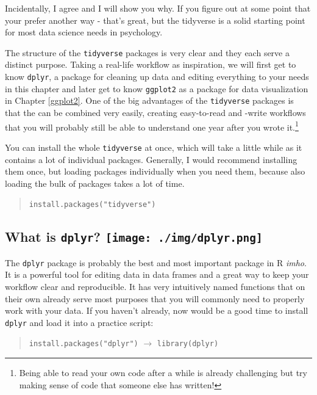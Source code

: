 \documentclass[
]{book}
\begin{document}
Incidentally, I agree and I will show you why.
If you figure out at some point that your prefer another way - that's great, but the tidyverse is a solid starting point for most data science needs in psychology.

The structure of the \texttt{tidyverse} packages is very clear and they each serve a distinct purpose.
Taking a real-life workflow as inspiration, we will first get to know \texttt{dplyr}, a package for cleaning up data and editing everything to your needs in this chapter and later get to know \texttt{ggplot2} as a package for data visualization in Chapter \ref{ggplot2}.
One of the big advantages of the \texttt{tidyverse} packages is that the can be combined very easily, creating easy-to-read and -write workflows that you will probably still be able to understand one year after you wrote it.\footnote{Being able to read your own code after a while is already challenging but try making sense of code that someone else has written!}

You can install the whole \texttt{tidyverse} at once, which will take a little while as it contains a lot of individual packages.
Generally, I would recommend installing them once, but loading packages individually when you need them, because also loading the bulk of packages takes a lot of time.

\begin{quote}
\texttt{install.packages("tidyverse")}
\end{quote}

\subsection[What is \texttt{dplyr}? ]{\texorpdfstring{What is \texttt{dplyr}? \protect\texttt{[image: ./img/dplyr.png]}}{What is dplyr? dplyr logo}}\label{what-is-dplyr-dplyr-logo}

The \texttt{dplyr} package is probably the best and most important package in R \emph{imho}.
It is a powerful tool for editing data in data frames and a great way to keep your workflow clear and reproducible.
It has very intuitively named functions that on their own already serve most purposes that you will commonly need to properly work with your data.
If you haven't already, now would be a good time to install \texttt{dplyr} and load it into a practice script:

\begin{quote}
\texttt{install.packages("dplyr")} \(\rightarrow\) \texttt{library(dplyr)}
\end{quote}
\end{document}

